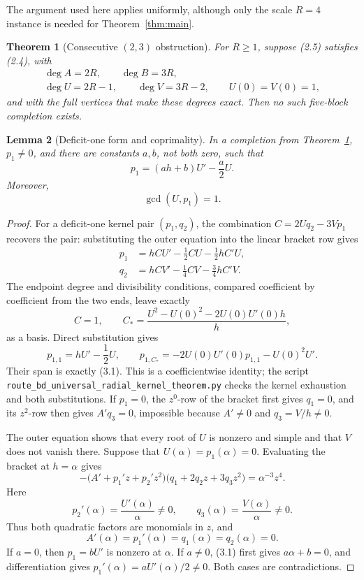 \documentclass[11pt]{article}
\newtheorem{theorem}{Theorem}[section]
\newtheorem{lemma}[theorem]{Lemma}
\theoremstyle{definition}
\theoremstyle{remark}
\begin{document}
The argument used here applies uniformly, although only the scale
\(R=4\) instance is needed for Theorem~\ref{thm:main}.

\begin{theorem}[Consecutive \((2,3)\) obstruction]\label{thm:allscale}
For \(R\geq1\), suppose (2.5) satisfies (2.4), with
\[
\begin{gathered}
\deg A=2R,\qquad \deg B=3R,\\
\deg U=2R-1,\qquad\deg V=3R-2,\qquad U(0)=V(0)=1,
\end{gathered}
\]
and with the full vertices that make these degrees exact.  Then no such
five-block completion exists.
\end{theorem}

\begin{lemma}[Deficit-one form and coprimality]\label{lem:deficit-one}
In a completion from Theorem~\ref{thm:allscale}, \(p_1\ne0\), and there
are constants \(a,b\), not both zero, such that
\[
   p_1=(ah+b)U'-\frac a2U.                              \tag{3.1}
\]
Moreover,
\[
   \gcd(U,p_1)=1.                                      \tag{3.2}
\]
\end{lemma}

\begin{proof}
For a deficit-one kernel pair \((p_1,q_2)\), the combination
\(C=2Uq_2-3Vp_1\) recovers the pair: substituting the outer equation
into the linear bracket row gives
\[
\begin{aligned}
p_1&=hCU'-\frac12CU-\frac12hC'U,\\
q_2&=hCV'-\frac14CV-\frac34hC'V.
\end{aligned}
\]
The endpoint degree and divisibility conditions, compared coefficient by
coefficient from the two ends, leave exactly
\[
 C=1,\qquad
 C_*=\frac{U^2-U(0)^2-2U(0)U'(0)h}{h},
\]
as a basis.  Direct substitution gives
\[
 p_{1,1}=hU'-\frac12U,\qquad
 p_{1,C_*}
 =-2U(0)U'(0)p_{1,1}-U(0)^2U'.
\]
Their span is exactly (3.1).  This is a coefficientwise identity; the
script
\texttt{route\_bd\_universal\_radial\_kernel\_theorem.py} checks the
kernel exhaustion and both substitutions.  If \(p_1=0\), the
\(z^0\)-row of the bracket first gives \(q_1=0\), and its \(z^2\)-row
then gives \(A'q_3=0\), impossible because \(A'\ne0\) and \(q_3=V/h\ne0\).

The outer equation shows that every root of \(U\) is nonzero and simple
and that \(V\) does not vanish there.  Suppose that
\(U(\alpha)=p_1(\alpha)=0\).  Evaluating the bracket at \(h=\alpha\)
gives
\[
 -\bigl(A'+p_1'z+p_2'z^2\bigr)
  \bigl(q_1+2q_2z+3q_3z^2\bigr)
 =\alpha^{-3}z^4.
\]
Here
\[
 p_2'(\alpha)=\frac{U'(\alpha)}{\alpha}\ne0,\qquad
 q_3(\alpha)=\frac{V(\alpha)}{\alpha}\ne0.
\]
Thus both quadratic factors are monomials in \(z\), and
\[
 A'(\alpha)=p_1'(\alpha)=q_1(\alpha)=q_2(\alpha)=0.
\]
If \(a=0\), then \(p_1=bU'\) is nonzero at \(\alpha\).  If \(a\ne0\),
(3.1) first gives \(a\alpha+b=0\), and differentiation gives
\(p_1'(\alpha)=aU'(\alpha)/2\ne0\).  Both cases are contradictions.
\end{proof}
\end{document}
